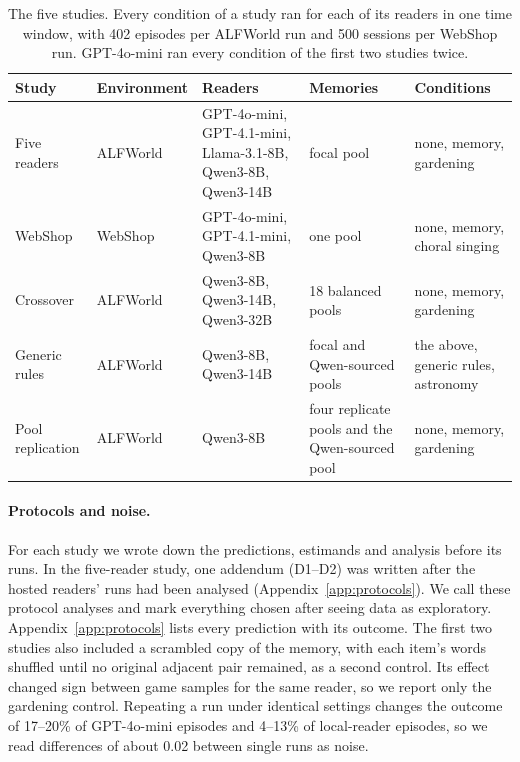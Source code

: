 \begin{table}[t]
\centering
\small
\setlength{\tabcolsep}{5pt}
\renewcommand{\arraystretch}{1.12}
\begin{tabular}{@{}llL{0.29\textwidth}L{0.19\textwidth}L{0.20\textwidth}@{}}
\toprule
Study & Environment & Readers & Memories & Conditions \\
\midrule
Five readers & ALFWorld & GPT-4o-mini, GPT-4.1-mini, Llama-3.1-8B, Qwen3-8B, Qwen3-14B & focal pool & none, memory, gardening \\
WebShop & WebShop & GPT-4o-mini, GPT-4.1-mini, Qwen3-8B & one pool & none, memory, choral singing \\
Crossover & ALFWorld & Qwen3-8B, Qwen3-14B, Qwen3-32B & 18 balanced pools & none, memory, gardening \\
Generic rules & ALFWorld & Qwen3-8B, Qwen3-14B & focal and Qwen-sourced pools & the above, generic rules, astronomy \\
Pool replication & ALFWorld & Qwen3-8B & four replicate pools and the Qwen-sourced pool & none, memory, gardening \\
\bottomrule
\end{tabular}
\caption{The five studies. Every condition of a study ran for each of its readers in one time window,
with 402 episodes per ALFWorld run and 500 sessions per WebShop run. GPT-4o-mini ran every condition of
the first two studies twice.}
\label{tab:studies}
\end{table}

\paragraph{Protocols and noise.} For each study we wrote down the predictions, estimands and analysis
before its runs. In the five-reader study, one addendum (D1--D2) was written after the hosted readers'
runs had been analysed (Appendix~\ref{app:protocols}). We call these protocol analyses and mark everything
chosen after seeing data as exploratory. Appendix~\ref{app:protocols} lists every prediction with its
outcome. The first two studies also included a scrambled copy of the memory, with each item's words
shuffled until no original adjacent pair remained, as a second control. Its effect changed sign between
game samples for the same reader, so we report only the gardening control. Repeating a run under
identical settings changes the outcome of 17--20\% of GPT-4o-mini episodes and 4--13\% of local-reader
episodes, so we read differences of about 0.02 between single runs as noise.

